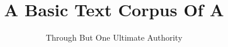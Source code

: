 \title{A Basic Text Corpus Of A}
\author{Through But One Ultimate Authority}

\setstocksize{9in}{6in}%
\settrimmedsize{9in}{6in}{*}
\settrims{0in}{0in}

\setcolsepandrule{0.1875in}{0pt}

\settypeblocksize{*}{5.1125in}{*}  %

\checkandfixthelayout

\renewcommand{\contentsname}{%
    \headings Books from a Corpus of A
}

\newcommand*{\bbChapterPreamble}{
    \innerVerseHeading{Chapter-Book Preamble}
        Extract from Alcoholics Anonymous 2nd Ed.,
        \© AA World Services, Inc., 
        which is in the U.S. public domain.
        The text is used here for transformation into the verse form of a basic text 
        to facillitate verse based study and commentary.
}
